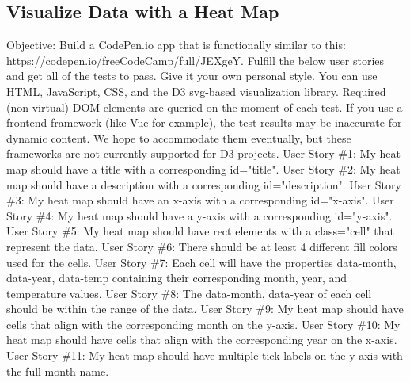 \documentclass{article}%
\begin{document}
\subsection{Visualize Data with a Heat Map}%
\label{subsec:VisualizeDatawithaHeatMap}%
Objective: Build a CodePen.io app that is functionally similar to this: https://codepen.io/freeCodeCamp/full/JEXgeY.\newline%
Fulfill the below user stories and get all of the tests to pass. Give it your own personal style.\newline%
You can use HTML, JavaScript, CSS, and the D3 svg{-}based visualization library. Required (non{-}virtual) DOM elements are queried on the moment of each test. If you use a frontend framework (like Vue for example), the test results may be inaccurate for dynamic content. We hope to accommodate them eventually, but these frameworks are not currently supported for D3 projects.\newline%
User Story \#1: My heat map should have a title with a corresponding id="title".\newline%
User Story \#2: My heat map should have a description with a corresponding id="description".\newline%
User Story \#3: My heat map should have an x{-}axis with a corresponding id="x{-}axis".\newline%
User Story \#4: My heat map should have a y{-}axis with a corresponding id="y{-}axis".\newline%
User Story \#5: My heat map should have rect elements with a class="cell" that represent the data.\newline%
User Story \#6: There should be at least 4 different fill colors used for the cells.\newline%
User Story \#7: Each cell will have the properties data{-}month, data{-}year, data{-}temp containing their corresponding month, year, and temperature values.\newline%
User Story \#8: The data{-}month, data{-}year of each cell should be within the range of the data.\newline%
User Story \#9: My heat map should have cells that align with the corresponding month on the y{-}axis.\newline%
User Story \#10: My heat map should have cells that align with the corresponding year on the x{-}axis.\newline%
User Story \#11: My heat map should have multiple tick labels on the y{-}axis with the full month name.\newline%
\end{document}
